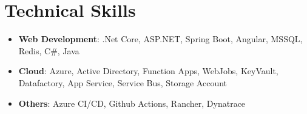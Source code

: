 \section{\textbf{Technical Skills}}
\begin{itemize}
	\small
	\setlength{\itemsep}{0pt}
	\setlength{\parskip}{0pt}
	\setlength{\parsep}{0pt}
	\item \textbf{Web Development}: .Net Core, ASP.NET, Spring Boot, Angular, MSSQL, Redis, C\#, Java
	\item \textbf{Cloud}: Azure, Active Directory, Function Apps, WebJobs, KeyVault, Datafactory, App Service, Service Bus, Storage Account
	\item \textbf{Others}: Azure CI/CD, Github Actions, Rancher, Dynatrace
\end{itemize}